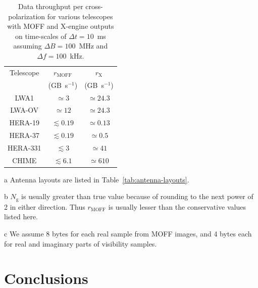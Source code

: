 \documentclass[a4paper,fleqn,usenatbib]{mnras}
\newcommand{\Ngrid}{N_\textrm{g}}
\begin{document}
\begin{table}
  \centering
  \caption{Data throughput per cross-polarization for various telescopes with 
    MOFF and X-engine outputs on time-scales of $\Delta t=10$~ms assuming 
    $\Delta B=100$~MHz and $\Delta f=100$~kHz.}
  \label{tab:data-rates}
  \begin{threeparttable}
  \begin{tabular}{ccc} 
    \hline
    Telescope\tnote{a} & $r_\textrm{MOFF}$\tnote{b} & $r_\textrm{X}$ \\
              & (GB~s$^{-1}$)\tnote{c} & (GB~s$^{-1}$)\tnote{c} \\
    \hline
    LWA1 & $\simeq 3$ & $\simeq 24.3$ \\
    LWA-OV & $\simeq 12$ & $\simeq 24.3$ \\
    HERA-19 & $\lesssim 0.19$ & $\simeq 0.13$ \\
    HERA-37 & $\lesssim 0.19$ & $\simeq 0.5$ \\
    HERA-331 & $\lesssim 3$ & $\simeq 41$ \\
    CHIME & $\lesssim 6.1$ & $\simeq 610$ \\
    \hline
  \end{tabular}
  \begin{tablenotes}
    \item[a] Antenna layouts are listed in Table~\ref{tab:antenna-layouts}.
    \item[b] $\Ngrid$ is usually greater than true value because of 
      rounding to the next power of 2 in either direction. Thus 
      $r_\textrm{MOFF}$ is usually lesser than the conservative values 
      listed here.
    \item[c] We assume 8 bytes for each real sample from MOFF images, and
      4 bytes each for real and imaginary parts of visibility samples.
  \end{tablenotes}
  \end{threeparttable}
\end{table}

\section{Conclusions}\label{sec:conclusions}
\end{document}
